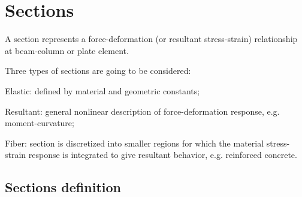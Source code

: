 \section{Sections}
A section represents a force-deformation (or resultant stress-strain) relationship at beam-column or plate element.

Three types of sections are going to be considered:
\begin{description}
\item{Elastic:} defined by material and geometric constants;
\item{Resultant:} general nonlinear description of force-deformation response, e.g. moment-curvature;
\item{Fiber:} section is discretized into smaller regions for which the material stress-strain response is integrated to give resultant behavior, e.g. reinforced concrete.
\end{description}
\subsection{Sections definition}

